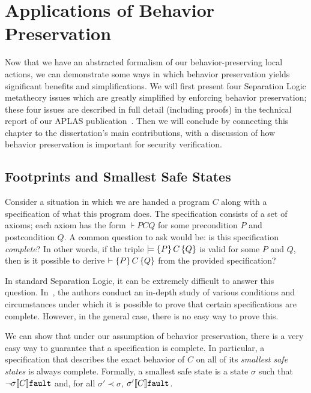 \section{Applications of Behavior Preservation}
\label{metatheory}

Now that we have an abstracted formalism of our
behavior-preserving local actions, we can demonstrate some
ways in which behavior preservation yields significant
benefits and simplifications. We will first present
four Separation Logic metatheory issues which are greatly
simplified by enforcing behavior preservation; these four
issues are described in full detail (including proofs) in the technical report of
our APLAS publication~\cite{costanzo12:bpsltr}. Then we will conclude by connecting this 
chapter to the dissertation's main contributions, with a discussion of
how behavior preservation is important for security verification.

\subsection{Footprints and Smallest Safe States}
\label{ssec:footprint}

Consider a situation in which we are handed a program $C$ along with a specification of what this program
does. The specification consists of a set of axioms; each axiom has the form $\assert{P}{C}{Q}$
for some precondition $P$ and postcondition $Q$. A common question to ask would be: is this specification
\emph{complete}? In other words, if the triple $\assertm{P}{C}{Q}$ is valid for some $P$ and $Q$, then
is it possible to derive $\assertd{P}{C}{Q}$ from the provided specification?

In standard Separation Logic, it can be extremely difficult to answer this question. In~\cite{rg09},
the authors conduct an in-depth study of various conditions and circumstances under which it is possible to prove 
that certain specifications are  complete. However, in the general case, there is no easy way to 
prove this.

We can show that under our assumption of behavior preservation, there is a very easy way to guarantee that
a specification is complete. In particular, a specification that describes the exact behavior of $C$
on all of its \emph{smallest safe states} is always complete. Formally, a smallest safe state is a 
state $\sigma$ such that $\lnot \relate{\den{C}}{\sigma}{\fault}$ and, for all $\sigma' \prec \sigma$,
$\relate{\den{C}}{\sigma'}{\fault}$.

